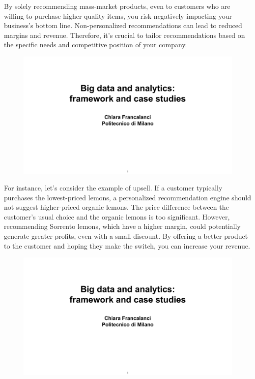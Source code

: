 By solely recommending mass-market products, even to customers who are
willing to purchase higher quality items, you risk negatively impacting
your business's bottom line. Non-personalized recommendations can lead
to reduced margins and revenue. Therefore, it's crucial to tailor
recommendations based on the specific needs and competitive position of
your company.

\begin{figure}[!h]
  \centering
  \includegraphics[page=91, trim = 0cm 0.7cm 1.5cm 1cm, clip, width=\imagewidth]{images/06 - BIG_DATA.pdf}
\end{figure}

For instance, let's consider the example of upsell. If a customer
typically purchases the lowest-priced lemons, a personalized
recommendation engine should not suggest higher-priced organic lemons.
The price difference between the customer's usual choice and the organic
lemons is too significant. However, recommending Sorrento lemons, which
have a higher margin, could potentially generate greater profits, even
with a small discount. By offering a better product to the customer and
hoping they make the switch, you can increase your revenue.

\begin{figure}[!h]
  \centering
  \includegraphics[page=92, trim = 0cm 1.5cm 1.5cm 1cm, clip, width=\imagewidth]{images/06 - BIG_DATA.pdf}
\end{figure}

